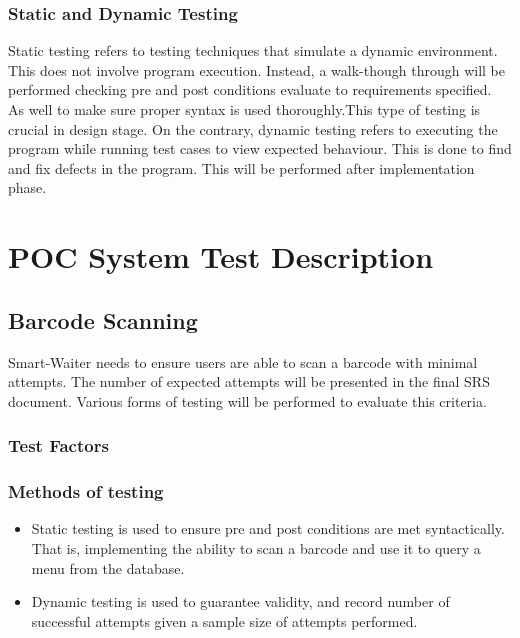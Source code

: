 \documentclass[12pt]{article}
\begin{document}
\subsubsection{Static and Dynamic Testing}
Static testing refers to testing techniques that simulate a dynamic environment. This does not involve program execution. Instead, a walk-though through will be performed checking pre and post conditions evaluate to requirements specified. As well to make sure proper syntax is used thoroughly.This type of testing is crucial in design stage. On the contrary, dynamic testing refers to executing the program while running test cases to view expected behaviour. This is done to find and fix defects in the program. This will be performed after implementation phase. 

%
%

\section{POC System Test Description}


\subsection{Barcode Scanning}
Smart-Waiter needs to ensure users are able to scan a barcode with minimal attempts. The number of expected attempts will be presented in the final SRS document. Various forms of testing will be performed to evaluate this criteria.

\subsubsection{Test Factors}

\subsubsection{Methods of testing}
\begin{itemize}
  \item Static testing is used to ensure pre and post conditions are met syntactically. That is, implementing the ability to scan a barcode and use it to query a menu from the database.
  \item Dynamic testing is used to guarantee validity, and record number of successful attempts given a sample size of attempts performed.
\end{itemize}
\end{document}
